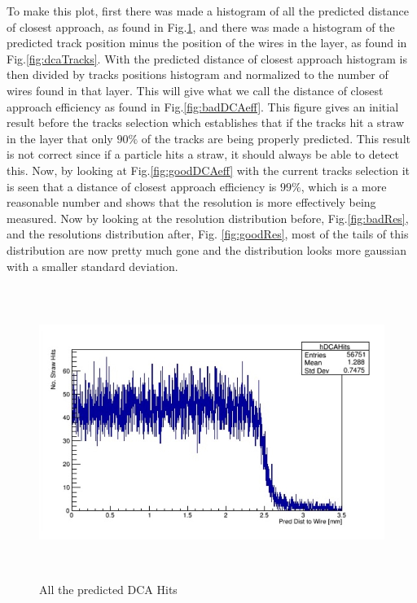 \documentclass[./Thesis]{subfiles}
\begin{document}
  To make this plot, first there was made a histogram of all the predicted distance of closest approach, as found in Fig.\ref{fig:dcaHits}, and there was made a histogram of the predicted track position minus the position of the wires in the layer, as found in Fig.\ref{fig:dcaTracks}. With the predicted distance of closest approach histogram is then divided by tracks positions histogram and normalized to the number of wires found in that layer.  This will give what we call the distance of closest approach efficiency as found in Fig.\ref{fig:badDCAeff}. This figure gives an initial result before the tracks selection which establishes that if the tracks hit a straw in the layer that only $90\%$ of the tracks are being properly predicted. This result is not correct since if a particle hits a straw, it should always be able to detect this. Now, by looking at Fig.\ref{fig:goodDCAeff} with the current tracks selection it is seen that a distance of closest approach efficiency is  $99\%$, which is a more reasonable number and shows that the resolution is more effectively being measured. Now by looking at the resolution distribution before, Fig.\ref{fig:badRes}, and the resolutions distribution after, Fig. \ref{fig:goodRes}, most of the tails of this distribution are now pretty much gone and the distribution looks more gaussian with a smaller standard deviation.


\begin{figure}
	\centerline{\includegraphics[height=95mm]{DCAHits.jpeg}}
	\caption[dcaHits]{ All the predicted DCA Hits}
	\label{fig:dcaHits}
\end{figure} 	
\end{document}
